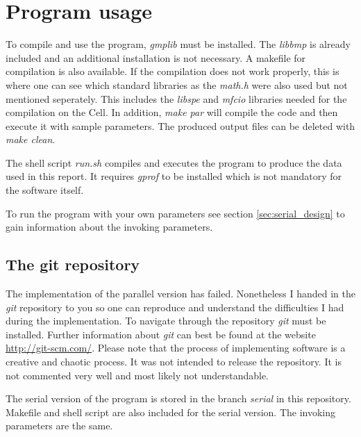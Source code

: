 \section{Program usage}
\label{sec:usage}

To compile and use the program, \emph{gmplib} must be installed. The \emph{libbmp} is already included and an additional installation is not necessary. A makefile for compilation is also available. If the compilation does not work properly, this is where one can see which standard libraries as the \emph{math.h} were also used but not mentioned seperately. This includes the \emph{libspe} and \emph{mfcio} libraries needed for the compilation on the Cell. In addition, \emph{make par} will compile the code and then execute it with sample parameters. The produced output files can be deleted with \emph{make clean}.

The shell script \emph{run.sh} compiles and executes the program to produce the data used in this report. It requires \emph{gprof} to be installed which is not mandatory for the software itself.

To run the program with your own parameters see section \ref{sec:serial_design} to gain information about the invoking parameters.

\subsection{The git repository}
The implementation of the parallel version has failed. Nonetheless I handed in the \emph{git} repository to you so one can reproduce and understand the difficulties I had during the implementation. To navigate through the repository \emph{git} must be installed. Further information about \emph{git} can best be found at the website \url{http://git-scm.com/}.
Please note that the process of implementing software is a creative and chaotic process. It was not intended to release the repository. It is not commented very well and most likely not understandable.

The serial version of the program is stored in the branch \emph{serial} in this repository. Makefile and shell script are also included for the serial version. The invoking parameters are the same. 



